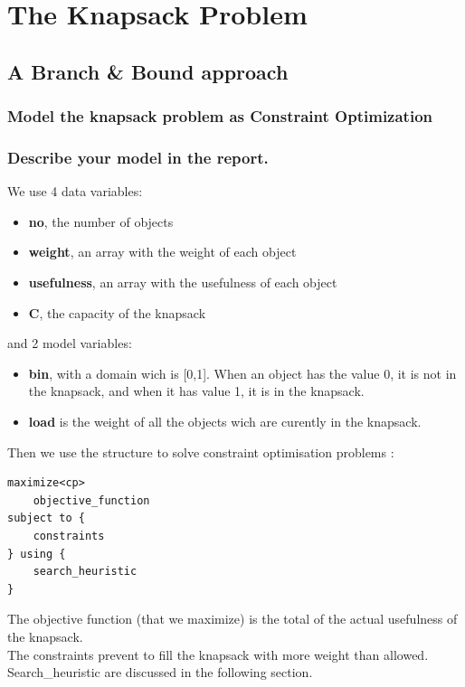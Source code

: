\documentclass[a4paper ,12pt,french]{article}
\begin{document}
\section{The Knapsack Problem}

\subsection{A Branch \& Bound approach}

\subsubsection{Model the knapsack problem as Constraint Optimization}


\subsubsection{Describe your model in the report.}

We use 4 data variables: 
\begin{itemize}
\item \textbf{no}, the number of objects
\item \textbf{weight}, an array with the weight of each object
\item \textbf{usefulness}, an array with the usefulness of each object
\item \textbf{C}, the capacity of the knapsack\\
\end{itemize}

and 2 model variables:
\begin{itemize}
\item \textbf{bin}, with a domain wich is [0,1]. When an object has the value 0, it is not in the knapsack, and when it has value 1, it is in the knapsack.
\item \textbf{load} is the weight of all the objects wich are curently in the knapsack.\\
\end{itemize}

Then we use the structure to solve constraint optimisation problems :
\begin{verbatim}
maximize<cp>
    objective_function
subject to {
    constraints
} using {
    search_heuristic
}
\end{verbatim}

The objective function (that we maximize) is the total of the actual usefulness of the knapsack.\\
The constraints prevent to fill the knapsack with more weight than allowed.\\
Search\_heuristic are discussed in the following section.
\end{document}
